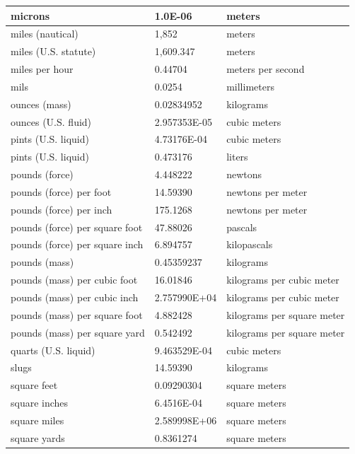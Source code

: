 \documentclass{fidata-report-template}
\begin{document}
{\begin{longtable}{||l|l|l||}
    \hline
    microns & 1.0E-06 & meters\\
    \hline
    miles (nautical) & 1,852 & meters\\
    \hline
    miles (U.S. statute) & 1,609.347 & meters\\
    \hline
    miles per hour & 0.44704 & meters per second\\
    \hline
    mils & 0.0254 & millimeters\\
    \hline
    ounces (mass) & 0.02834952 & kilograms\\
    \hline
    ounces (U.S. fluid) & 2.957353E-05 & cubic meters\\
    \hline
    pints (U.S. liquid) & 4.73176E-04 & cubic meters\\
    \hline
    pints (U.S. liquid) & 0.473176 & liters\\
    \hline
    pounds (force) & 4.448222 & newtons\\
    \hline
    pounds (force) per foot & 14.59390 & newtons per meter\\
    \hline
    pounds (force) per inch & 175.1268 & newtons per meter\\
    \hline
    pounds (force) per square foot & 47.88026 & pascals\\
    \hline
    pounds (force) per square inch & 6.894757 & kilopascals\\
    \hline
    pounds (mass) & 0.45359237 & kilograms\\
    \hline
    pounds (mass) per cubic foot & 16.01846 & kilograms per cubic meter\\
    \hline
    pounds (mass) per cubic inch & 2.757990E+04 & kilograms per cubic meter\\
    \hline
    pounds (mass) per square foot & 4.882428 & kilograms per square meter\\
    \hline
    pounds (mass) per square yard & 0.542492 & kilograms per square meter\\
    \hline
    quarts (U.S. liquid) & 9.463529E-04 & cubic meters\\
    \hline
    slugs & 14.59390 & kilograms\\
    \hline
    square feet & 0.09290304 & square meters\\
    \hline
    square inches & 6.4516E-04 & square meters\\
    \hline
    square miles & 2.589998E+06 & square meters\\
    \hline
    square yards & 0.8361274 & square meters\\

\end{longtable}}
\end{document}
